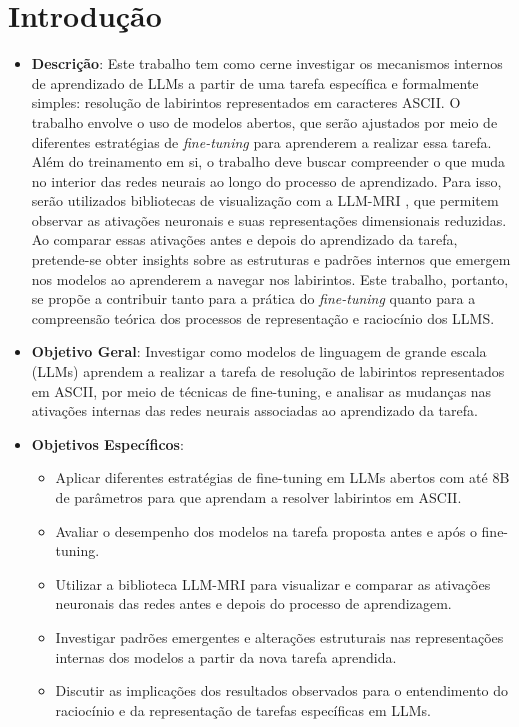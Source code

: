\section{Introdução}

\begin{itemize}
    \item \textbf{Descrição}: Este trabalho tem como cerne investigar os mecanismos internos de aprendizado de LLMs a partir de uma tarefa específica e formalmente simples: resolução de labirintos representados em caracteres ASCII. O trabalho envolve o uso de modelos abertos, que serão ajustados por meio de diferentes estratégias de \textit{fine-tuning} para aprenderem a realizar essa tarefa. Além do treinamento em si, o trabalho deve buscar compreender o que muda no interior das redes neurais ao longo do processo de aprendizado. Para isso, serão utilizados bibliotecas de visualização com a LLM-MRI \cite{costa2024llmmri}, que permitem observar as ativações neuronais e suas representações dimensionais reduzidas. Ao comparar essas ativações antes e depois do aprendizado da tarefa, pretende-se obter insights sobre as estruturas e padrões internos que emergem nos modelos ao aprenderem a navegar nos labirintos. Este trabalho, portanto, se propõe a contribuir tanto para a prática do \textit{fine-tuning} quanto para a compreensão teórica dos processos de representação e raciocínio dos LLMS.

    \item \textbf{Objetivo Geral}: Investigar como modelos de linguagem de grande escala (LLMs) aprendem a realizar a tarefa de resolução de labirintos representados em ASCII, por meio de técnicas de fine-tuning, e analisar as mudanças nas ativações internas das redes neurais associadas ao aprendizado da tarefa.

    \item \textbf{Objetivos Específicos}:
        \begin{itemize}
            \item Aplicar diferentes estratégias de fine-tuning em LLMs abertos com até 8B de parâmetros para que aprendam a resolver labirintos em ASCII.
            \item Avaliar o desempenho dos modelos na tarefa proposta antes e após o fine-tuning.
            \item Utilizar a biblioteca LLM-MRI para visualizar e comparar as ativações neuronais das redes antes e depois do processo de aprendizagem.
            \item Investigar padrões emergentes e alterações estruturais nas representações internas dos modelos a partir da nova tarefa aprendida.
            \item Discutir as implicações dos resultados observados para o entendimento do raciocínio e da representação de tarefas específicas em LLMs.
        \end{itemize}
\end{itemize}
